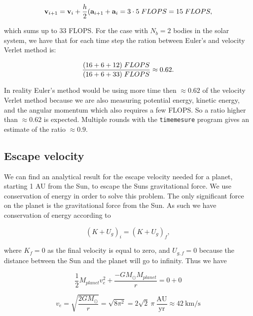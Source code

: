 \documentclass[a4paper, fontsize=11pt]{article}
\begin{document}
\begin{equation}
\textbf{v}_{i + 1} = \textbf{v}_i + \frac{h}{2}(\textbf{a}_{i+1} + \textbf{a}_i = 3 \cdot 5 \hspace{1mm} FLOPS = 15 \hspace{1mm} FLOPS,
\end{equation}

which sums up to 33 FLOPS. For the case with $N_b = 2$ bodies in the solar system, we have that for each time step the ration between Euler's and velocity Verlet method is:

\begin{equation}
\frac{(16 + 6 + 12) \hspace{1mm} FLOPS}{(16 + 6 + 33) \hspace{1mm} FLOPS} \approx 0.62.
\end{equation}

In reality Euler's method would be using more time then $\approx 0.62$ of the velocity Verlet method because we are also measuring potential energy, kinetic energy, and the angular momentum which also requires a few FLOPS. So a ratio higher than $\approx 0.62$ is expected. Multiple rounds with the \verb+timemesure+ program gives an estimate of the ratio $\approx 0.9$.


\subsection{Escape velocity}

We can find an analytical result for the escape velocity needed for a planet, starting 1 AU from the Sun, to escape the Suns gravitational force. We use conservation of energy in order to solve this problem. The only significant force on the planet is the gravitational force from the Sun. As such we have conservation of energy according to

\begin{equation}
(K + U_{g})_{i}=(K+U_{g})_{f},
\end{equation}

where $K_{f}=0$ as the final velocity is equal to zero, and $U_{g,f} = 0$ because the distance between the Sun and the planet will go to infinity. Thus we have

\begin{equation}
\dfrac{1}{2} M_{planet} v_{e}^2 + \dfrac{- G M_{\odot} M_{planet}}{r} = 0 + 0
\end{equation}

\begin{equation}
v_{e} = \sqrt{\dfrac{2 G M_{\odot}}{r}} = \sqrt{8 \pi^2}=2 \sqrt{2} \: \pi \: \frac{\text{AU}}{\text{yr}} \approx 42 \:  \text{km}/\text{s}
\end{equation}
\end{document}
